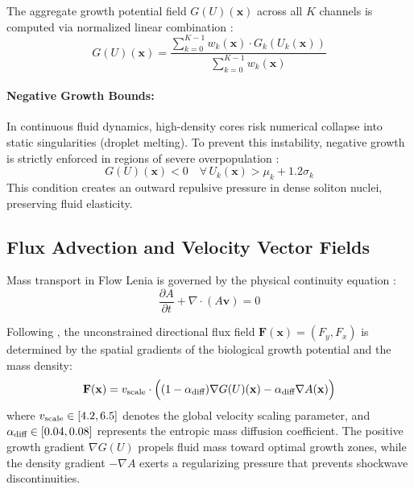 The aggregate growth potential field $G(U)(\mathbf{x})$ across all $K$ channels is computed via normalized linear combination \parencite{plantec2025flowlenia}:
\begin{equation}
G(U)(\mathbf{x}) = \frac{\sum_{k=0}^{K-1} w_k(\mathbf{x}) \cdot G_k(U_k(\mathbf{x}))}{\sum_{k=0}^{K-1} w_k(\mathbf{x})}
\label{eq:total_growth_field}
\end{equation}

\paragraph{Negative Growth Bounds:} In continuous fluid dynamics, high-density cores risk numerical collapse into static singularities (droplet melting). To prevent this instability, negative growth is strictly enforced in regions of severe overpopulation \parencite{plantec2025flowlenia}:
\begin{equation}
G(U)(\mathbf{x}) < 0 \quad \forall \, U_k(\mathbf{x}) > \mu_k + 1.2\sigma_k
\label{eq:negative_growth_bound}
\end{equation}
This condition creates an outward repulsive pressure in dense soliton nuclei, preserving fluid elasticity.

\subsection{Flux Advection and Velocity Vector Fields}
\label{subsec:model_flux_advection}

Mass transport in Flow Lenia is governed by the physical continuity equation \parencite{plantec2025flowlenia}:
\begin{equation}
\frac{\partial A}{\partial t} + \nabla \cdot (A \mathbf{v}) = 0
\label{eq:continuity_advection}
\end{equation}

Following \textcite{plantec2025flowlenia}, the unconstrained directional flux field $\mathbf{F}(\mathbf{x}) = (F_y, F_x)$ is determined by the spatial gradients of the biological growth potential and the mass density:
\begin{equation}
\mathbf{F}(\mathbf{x}) = v_{\text{scale}} \cdot \Big( (1 - \alpha_{\text{diff}}) \nabla G(U)(\mathbf{x}) - \alpha_{\text{diff}} \nabla A(\mathbf{x}) \Big)
\label{eq:unconstrained_flux}
\end{equation}
where $v_{\text{scale}} \in [4.2, 6.5]$ denotes the global velocity scaling parameter, and $\alpha_{\text{diff}} \in [0.04, 0.08]$ represents the entropic mass diffusion coefficient. The positive growth gradient $\nabla G(U)$ propels fluid mass toward optimal growth zones, while the density gradient $-\nabla A$ exerts a regularizing pressure that prevents shockwave discontinuities.

